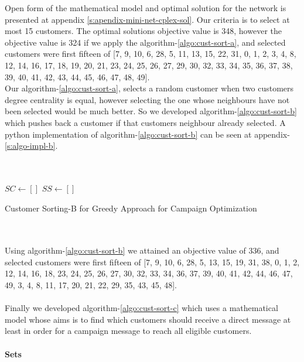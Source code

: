 \documentclass[11pt]{article}
\begin{document}
Open form of the mathematical model and optimal solution for the network is presented at appendix \ref{s:apendix-mini-net-cplex-sol}. Our criteria is to select at most 15 customers. The optimal solutions objective value is 348, however the objective value is 324 if we apply the algorithm-\ref{algo:cust-sort-a}, and selected customers were first fifteen of [7, 9, 10, 6, 28, 5, 11, 13, 15, 22, 31, 0, 1, 2, 3, 4, 8, 12, 14, 16, 17, 18, 19, 20, 21, 23, 24, 25, 26, 27, 29, 30, 32, 33, 34, 35, 36, 37, 38, 39, 40, 41, 42, 43, 44, 45, 46, 47, 48, 49]. \\

Our algorithm-\ref{algo:cust-sort-a}, selects a random customer when two customers degree centrality is equal, however selecting the one whose neighbours have not been selected would be much better. So we developed algorithm-\ref{algo:cust-sort-b} which pushes back a customer if that customers neighbour already selected. A python implementation of algorithm-\ref{algo:cust-sort-b} can be seen at appendix-\ref{s:algo-impl-b}.\\
\\
\\
\begin{algorithm}[H]
\State $SC \gets []$\;
\State $SS \gets []$\;

\caption{Customer Sorting-B for Greedy Approach for Campaign Optimization}
\label{algo:cust-sort-b}
\end{algorithm}
\\
\hbox{}
\\
Using algorithm-\ref{algo:cust-sort-b} we attained an objective value of 336, and selected customers were first fifteen of [7, 9, 10, 6, 28, 5, 13, 15, 19, 31, 38, 0, 1, 2, 12, 14, 16, 18, 23, 24, 25, 26, 27, 30, 32, 33, 34, 36, 37, 39, 40, 41, 42, 44, 46, 47, 49, 3, 4, 8, 11, 17, 20, 21, 22, 29, 35, 43, 45, 48].
\\
\hbox{}
\\
Finally we developed algorithm-\ref{algo:cust-sort-c} which uses a mathematical model whose aims is to find which customers should receive a direct message at least in order for a campaign message to reach all eligible customers.
\\
\hbox{}
\\
\noindent \textbf{Sets}\\
\end{document}
